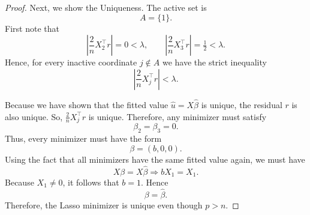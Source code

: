 \documentclass[12pt]{article}
\renewcommand{\(}{\left(}%
\renewcommand{\)}{\right)}%
\renewcommand{\[}{\left[}%
\renewcommand{\]}{\right]}%
\newtheorem{proof}{Proof.}}
\begin{document}
\begin{proof}
Next, we show the Uniqueness. The active set is
\begin{equation*}
A=\{1\}.
\end{equation*}
First note that
\begin{equation*}
\left|\frac{2}{n}X_2^\top r\right|=0<\lambda,
\qquad
\left|\frac{2}{n}X_3^\top r\right|=\tfrac12<\lambda .
\end{equation*}
Hence, for every inactive coordinate $j\notin A$ we have the strict inequality
\begin{equation*}
\left|\frac{2}{n}X_j^\top r\right|<\lambda .
\end{equation*}

Because we have shown that the fitted value $\hat u=X\hat\beta$ is unique, the residual $r$ is also unique. So, $\frac{2}{n}X_j^\top r$ is unique.
Therefore, any minimizer must satisfy
\begin{equation*}
\beta_2=\beta_3=0.
\end{equation*}
Thus, every minimizer must have the form
\begin{equation*}
\beta=(b,0,0).
\end{equation*}
Using the fact that all minimizers have the same fitted value again, we must have
\begin{equation*}
X\beta=X\hat\beta\Longrightarrow bX_1 = X_1.
\end{equation*}
Because $X_1\neq0$, it follows that $b=1$. Hence
\begin{equation*}
\beta=\hat\beta.
\end{equation*}
Therefore, the Lasso minimizer is unique even though $p>n$.
\end{proof}
\end{document}
